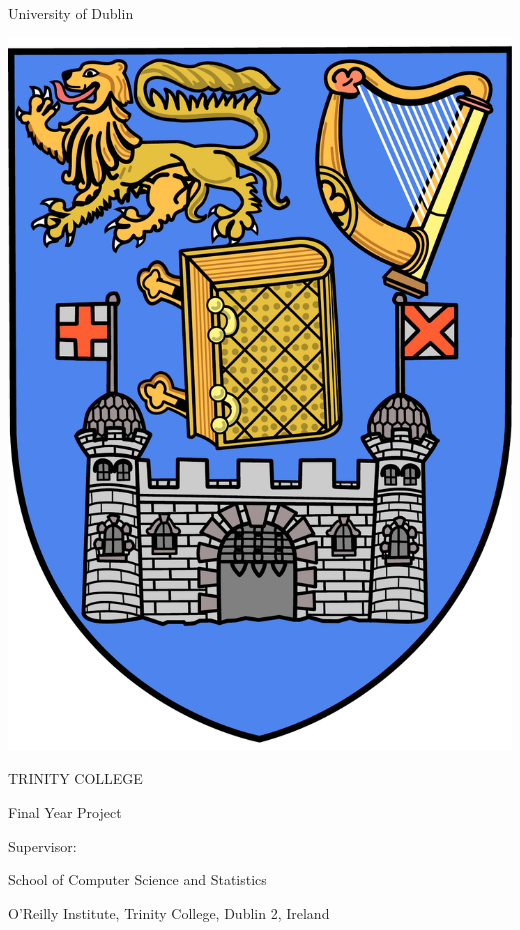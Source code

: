 \thispagestyle{empty}

{
  \centering

  \sffamily

  {\Large University of Dublin}

  \vspace{10pt}

  \includegraphics[scale=0.12]{tcd/trinitycollege.pdf}

  \vspace{10pt}

  {\Huge TRINITY COLLEGE}

  \vspace{80pt}
  
  \textbf{\Large \emph \projecttitle}

  \vspace{30pt}

  \authorname

  \degreetitle

  Final Year Project \datenospace

  Supervisor: \supervisorname

  \vspace{130pt}

  \large{
    School of Computer Science and Statistics

    O'Reilly Institute, Trinity College, Dublin 2, Ireland
  }

}


